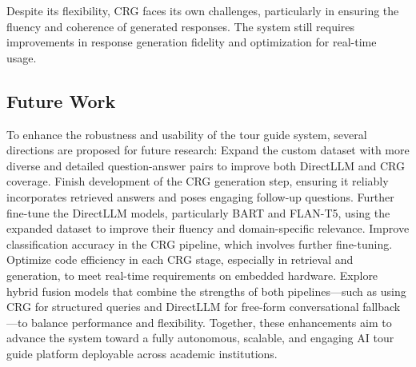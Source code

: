 \documentclass[conference]{IEEEtran}
\begin{document}
Despite its flexibility, CRG faces its own challenges, particularly in ensuring the fluency and coherence of generated responses. 
The system still requires improvements in response generation fidelity and optimization for real-time usage.

\subsection*{Future Work}
To enhance the robustness and usability of the tour guide system, several directions are proposed for future research:
Expand the custom dataset with more diverse and detailed question-answer pairs to improve both DirectLLM and CRG coverage.
Finish development of the CRG generation step, ensuring it reliably incorporates retrieved answers and poses engaging follow-up questions.
Further fine-tune the DirectLLM models, particularly BART and FLAN-T5, using the expanded dataset to improve their fluency and domain-specific relevance.
Improve classification accuracy in the CRG pipeline, which involves further fine-tuning.
Optimize code efficiency in each CRG stage, especially in retrieval and generation, to meet real-time requirements on embedded hardware.
Explore hybrid fusion models that combine the strengths of both pipelines—such as using CRG for structured queries and DirectLLM for free-form conversational fallback—to balance performance and flexibility.
Together, these enhancements aim to advance the system toward a fully autonomous, scalable, and engaging AI tour guide platform deployable across academic institutions.
\end{document}

